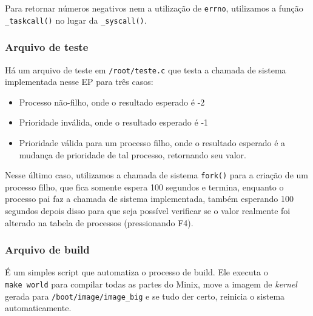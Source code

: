 \documentclass[]{article}
\providecommand{\tightlist}{%
  \setlength{\itemsep}{0pt}\setlength{\parskip}{0pt}}
\begin{document}
Para retornar números negativos nem a utilização de \texttt{errno},
utilizamos a função \texttt{\_taskcall()} no lugar da
\texttt{\_syscall()}.

\hypertarget{arquivo-de-teste}{%
\subsubsection{Arquivo de teste}\label{arquivo-de-teste}}

Há um arquivo de teste em \texttt{/root/teste.c} que testa a chamada de
sistema implementada nesse EP para três casos:

\begin{itemize}
\tightlist
\item
  Processo não-filho, onde o resultado esperado é -2
\item
  Prioridade inválida, onde o resultado esperado é -1
\item
  Prioridade válida para um processo filho, onde o resultado esperado é
  a mudança de prioridade de tal processo, retornando seu valor.
\end{itemize}

Nesse último caso, utilizamos a chamada de sistema \texttt{fork()} para
a criação de um processo filho, que fica somente espera 100 segundos e
termina, enquanto o processo pai faz a chamada de sistema implementada,
também esperando 100 segundos depois disso para que seja possível
verificar se o valor realmente foi alterado na tabela de processos
(pressionando F4).

\hypertarget{arquivo-de-build}{%
\subsubsection{Arquivo de build}\label{arquivo-de-build}}

É um simples script que automatiza o processo de build. Ele executa o
\texttt{make\ world} para compilar todas as partes do Minix, move a
imagem de \emph{kernel} gerada para \texttt{/boot/image/image\_big} e se
tudo der certo, reinicia o sistema automaticamente.
\end{document}
